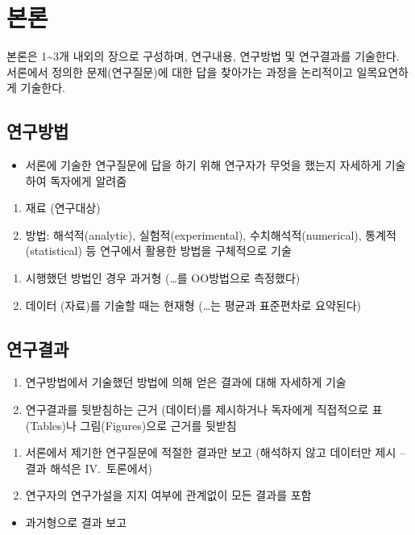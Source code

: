 \chapter{본\quad 론}

본론은 1\textasciitilde3개 내외의 장으로 구성하며, 연구내용, 연구방법 및 연구결과를 기술한다. 서론에서 정의한 문제(연구질문)에 대한 답을 찾아가는 과정을 논리적이고 일목요연하게 기술한다.

\section{연구방법}

\begin{itemize}
    \item 서론에 기술한 연구질문에 답을 하기 위해 연구자가 무엇을 했는지 자세하게 기술하여 독자에게 알려줌
\end{itemize}

\begin{enumerate}
    \item 재료 (연구대상)
    \item 방법: 해석적(analytic), 실험적(experimental), 수치해석적(numerical), 통계적(statistical) 등 연구에서 활용한 방법을 구체적으로 기술
\end{enumerate}

\begin{enumerate}
    \item 시행했던 방법인 경우 과거형 (\ldots 를 OO방법으로 측정했다)
    \item 데이터 (자료)를 기술할 때는 현재형 (\ldots 는 평균과 표준편차로 요약된다)
\end{enumerate}

\section{연구결과}

\begin{enumerate}
    \item 연구방법에서 기술했던 방법에 의해 얻은 결과에 대해 자세하게 기술
    \item 연구결과를 뒷받침하는 근거 (데이터)를 제시하거나 독자에게 직접적으로 표(Tables)나 그림(Figures)으로 근거를 뒷받침
\end{enumerate}

\begin{enumerate}
    \item 서론에서 제기한 연구질문에 적절한 결과만 보고 (해석하지 않고 데이터만 제시 -- 결과 해석은 IV.\ 토론에서)
    \item 연구자의 연구가설을 지지 여부에 관계없이 모든 결과를 포함
\end{enumerate}

\begin{itemize}
    \item 과거형으로 결과 보고
\end{itemize}

